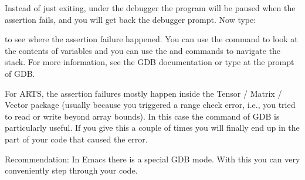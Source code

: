 Instead of just exiting, under the debugger the program will be paused
when the assertion fails, and you will get back the debugger prompt.
Now type:
\begin{quote}
\end{quote}  
to see where the assertion failure happened. You can use the
 command to look at the contents of variables and you
can use the  and  commands to navigate
the stack.  For more information, see the GDB documentation or type
 at the prompt of GDB.

For ARTS, the assertion failures mostly happen inside the Tensor /
Matrix / Vector package (usually because you triggered a range check
error, i.e., you tried to read or write beyond array bounds). In this
case the  command of GDB is particularly useful. If you
give this a couple of times you will finally end up in the part of
your code that caused the error.

Recommendation: In Emacs there is a special GDB mode. With this you
can very conveniently step through your code.




